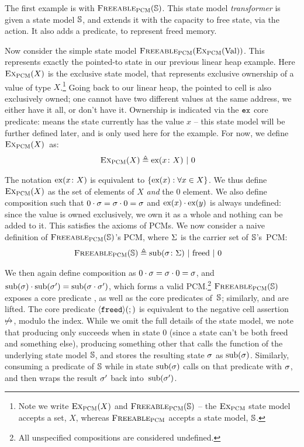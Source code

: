 The first example is with $\textsc{Freeable}_{\textsc{PCM}}(\mathbb S)$. This state model \emph{transformer} is given a state model $\mathbb S$, and extends it with the capacity to free state, via the \free{} action. It also adds a \freedP{} predicate, to represent freed memory.

Now consider the simple state model $\textsc{Freeable}_{\textsc{PCM}}(\textsc{Ex}_{\textsc{PCM}}(\text{Val}))$. This represents exactly the pointed-to state in our previous linear heap example. Here $\textsc{Ex}_{\textsc{PCM}}(X)$ is the exclusive state model, that represents exclusive ownership of a value of type $X$.\footnote{Note we write $\textsc{Ex}_{\textsc{PCM}}(X)$ and $\textsc{Freeable}_{\textsc{PCM}}(\mathbb S)$ -- the $\textsc{Ex}_{\textsc{PCM}}$ state model accepts a set, $X$, whereas $\textsc{Freeable}_{\textsc{PCM}}$ accepts a state model, $\mathbb S$.} Going back to our linear heap, the pointed to cell is also exclusively owned; one cannot have two different values at the same address, we either have it all, or don't have it. Ownership is indicated via the $\texttt{ex}$ core predicate:  means the state currently has the value $x$ -- this state model will be further defined later, and is only used here for the example. For now, we define $\textsc{Ex}_{\textsc{PCM}}(X)$~as:
\begin{align*}
	\textsc{Ex}_{\textsc{PCM}}(X) &\triangleq \text{ex}(x\colon X) ~|~ 0
\end{align*}

The notation $\text{ex}(x\colon X)$ is equivalent to $\{ \text{ex}(x) : \forall x\in X \}$. We thus define $\textsc{Ex}_{\textsc{PCM}}(X)$ as the set of elements of $X$ \emph{and} the $0$ element. We also define composition such that $0\cdot \sigma=\sigma\cdot 0=\sigma$ and $\text{ex}(x) \cdot \text{ex}(y)$ is always undefined: since the value is owned exclusively, we own it as a whole and nothing can be added to it. This satisfies the axioms of PCMs. We now consider a naive definition of $\textsc{Freeable}_{\textsc{PCM}}(\mathbb S)$'s PCM, where $\Sigma$ is the carrier set of $\mathbb S$'s~PCM:
\begin{align*}
	\textsc{Freeable}_{\textsc{PCM}}(\mathbb S) &\triangleq \text{sub}(\sigma\colon \Sigma) ~|~ \text{freed} ~|~ 0
\end{align*}

We then again define composition as $0 \cdot \sigma=\sigma \cdot 0=\sigma$, and $\text{sub}(\sigma) \cdot \text{sub}(\sigma')=\text{sub}(\sigma\cdot \sigma')$, which forms a valid PCM.\footnote{All unspecified compositions are considered undefined.} $\textsc{Freeable}_{\textsc{PCM}}(\mathbb S)$ exposes a core predicate \freedP, as well as the core predicates of~$\mathbb S$; similarly, \consume{} and \produce{} are lifted. The core predicate $\left<\texttt{freed}\right>\!(;)$ is equivalent to the negative cell assertion $\not\mapsto$, modulo the index. While we omit the full details of the state model, we note that producing \freedP{} only succeeds when in state $0$ (since a state can't be both freed and something else), producing something other that \freedP{} calls the \produce{} function of the underlying state model $\mathbb S$, and stores the resulting state $\sigma$ as $\text{sub}(\sigma)$. Similarly, consuming a predicate of $\mathbb S$ while in state $\text{sub}(\sigma)$ calls \consume{} on that predicate with $\sigma$, and then wraps the result $\sigma'$ back into~$\text{sub}(\sigma')$.

